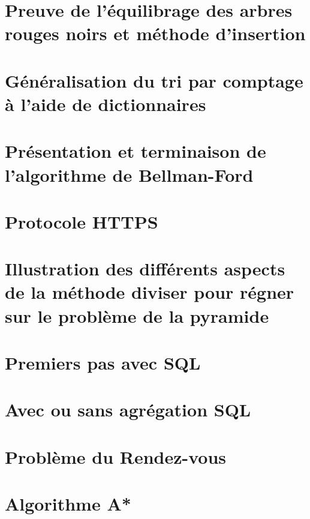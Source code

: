 \chapter{Preuve de l'équilibrage des arbres rouges noirs et méthode d'insertion}\label{D36}


\chapter{Généralisation du tri par comptage à l'aide de dictionnaires}\label{D37}


\chapter{Présentation et terminaison de l'algorithme de Bellman-Ford}\label{D38}


\chapter{Protocole HTTPS}\label{D39}


\chapter{Illustration des différents aspects de la méthode diviser pour régner sur le problème de la pyramide}\label{D40}


\chapter{Premiers pas avec SQL}\label{D41}


\chapter{Avec ou sans agrégation SQL}\label{D42}


\chapter{Problème du Rendez-vous} \label{D43}


\chapter{Algorithme A*} \label{D44}


